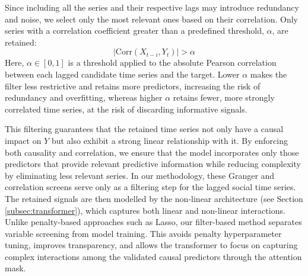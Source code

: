 \documentclass[acmsmall]{acmart}
\begin{document}
Since including all the series and their respective lags may introduce redundancy and noise, we select only the most relevant ones based on their correlation. Only series with a correlation coefficient greater than a predefined threshold, $\alpha$, are retained:
\begin{equation} \label{eq:equation_correlation}
|\text{Corr}(X_{t-i}, Y_t)| > \alpha 
\end{equation}
{\color{black}Here, $\alpha \in [0,1]$ is a threshold applied to the absolute Pearson correlation between each lagged candidate time series and the target. Lower $\alpha$ makes the filter less restrictive and retains more predictors, increasing the risk of redundancy and overfitting, whereas higher $\alpha$ retains fewer, more strongly correlated time series, at the risk of discarding informative signals.} 

This filtering guarantees that the retained time series not only have a causal impact on $Y$ but also exhibit a strong linear relationship with it. By enforcing both causality and correlation, we ensure that the model incorporates only those predictors that provide relevant predictive information while reducing complexity by eliminating less relevant series. {\color{black}In our methodology, these Granger and correlation screens serve only as a filtering step for the lagged social time series. The retained signals are then modelled by the non-linear architecture (see Section \ref{subsec:transformer}), which captures both linear and non-linear interactions.} {\color{black} Unlike penalty-based approaches such as Lasso, our filter-based method separates variable screening from model training. This avoids penalty hyperparameter tuning, improves transparency, and allows the transformer to focus on capturing complex interactions among the validated causal predictors through the attention mask.}
\end{document}
